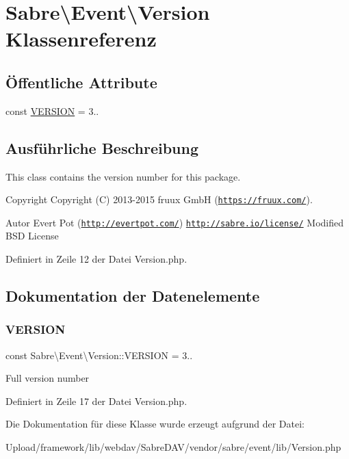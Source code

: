 \hypertarget{class_sabre_1_1_event_1_1_version}{}\section{Sabre\textbackslash{}Event\textbackslash{}Version Klassenreferenz}
\label{class_sabre_1_1_event_1_1_version}
\subsection*{Öffentliche Attribute}
\begin{DoxyCompactItemize}
\item 
const \mbox{\hyperlink{class_sabre_1_1_event_1_1_version_a43af9daddff63843afd3afbe0ed47303}{V\+E\+R\+S\+I\+ON}} = \textquotesingle{}3..\textquotesingle{}
\end{DoxyCompactItemize}


\subsection{Ausführliche Beschreibung}
This class contains the version number for this package.

\begin{DoxyCopyright}{Copyright}
Copyright (C) 2013-\/2015 fruux GmbH (\href{https://fruux.com/}{\tt https\+://fruux.\+com/}). 
\end{DoxyCopyright}
\begin{DoxyAuthor}{Autor}
Evert Pot (\href{http://evertpot.com/}{\tt http\+://evertpot.\+com/})  \href{http://sabre.io/license/}{\tt http\+://sabre.\+io/license/} Modified B\+SD License 
\end{DoxyAuthor}


Definiert in Zeile 12 der Datei Version.\+php.



\subsection{Dokumentation der Datenelemente}
\mbox{\label{class_sabre_1_1_event_1_1_version_a43af9daddff63843afd3afbe0ed47303}} 
\subsubsection{\texorpdfstring{V\+E\+R\+S\+I\+ON}{VERSION}}
{\footnotesize\ttfamily const Sabre\textbackslash{}\+Event\textbackslash{}\+Version\+::\+V\+E\+R\+S\+I\+ON = \textquotesingle{}3..\textquotesingle{}}

Full version number 

Definiert in Zeile 17 der Datei Version.\+php.



Die Dokumentation für diese Klasse wurde erzeugt aufgrund der Datei\+:\begin{DoxyCompactItemize}
\item 
Upload/framework/lib/webdav/\+Sabre\+D\+A\+V/vendor/sabre/event/lib/Version.\+php\end{DoxyCompactItemize}
